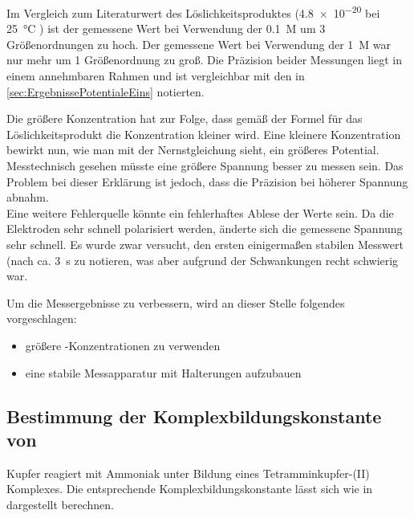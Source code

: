 \documentclass{article}
\begin{document}
        Im Vergleich zum Literaturwert des Löslichkeitsproduktes (\num{4.8e-20} bei \SI[mode=text]{25}{\degreeCelsius} \cite{LoslichkeitWerteCUOH}) ist der gemessene Wert bei Verwendung der \SI[mode=text]{0.1}{M}  um 3 Größenordnungen zu hoch. Der gemessene Wert bei Verwendung der \SI[mode=text]{1}{M}  war nur mehr um 1 Größenordnung zu groß. Die Präzision beider Messungen liegt in einem annehmbaren Rahmen und ist vergleichbar mit den in \ref{sec:ErgebnissePotentialeEins} notierten. 
        
        Die größere  Konzentration hat zur Folge, dass gemäß der Formel für das Löslichkeitsprodukt die  Konzentration kleiner wird. Eine kleinere  Konzentration bewirkt nun, wie man mit der Nernstgleichung sieht, ein größeres Potential. Messtechnisch gesehen müsste eine größere Spannung besser zu messen sein. Das Problem bei dieser Erklärung ist jedoch, dass die Präzision bei höherer Spannung abnahm. \\
        
        Eine weitere Fehlerquelle könnte ein fehlerhaftes Ablese der Werte sein. Da die Elektroden sehr schnell polarisiert werden, änderte sich die gemessene Spannung sehr schnell. Es wurde zwar versucht, den ersten einigermaßen stabilen Messwert (nach ca. \SI[mode=text]{3}{\second} zu notieren, was aber aufgrund der Schwankungen recht schwierig war.
        
        Um die Messergebnisse zu verbessern, wird an dieser Stelle folgendes vorgeschlagen: 
      
        \begin{itemize}
          \item größere -Konzentrationen zu verwenden
          \item eine stabile Messapparatur mit Halterungen aufzubauen
        \end{itemize}
     
      \pagebreak
        
      \subsection{Bestimmung der Komplexbildungskonstante von \ch{[Cu(NH3)4]\pch[2]}}
        
        Kupfer reagiert mit Ammoniak unter Bildung eines Tetramminkupfer-(II) Komplexes. Die entsprechende Komplexbildungskonstante lässt sich wie in dargestellt berechnen.
        
\end{document}
